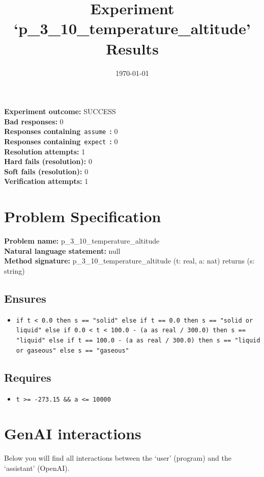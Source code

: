 \documentclass{article}
\begin{document}
\title{Experiment `p\_3\_10\_temperature\_altitude' Results}
\author{\today}
\date{}
\maketitle
\textbf{Experiment outcome: }SUCCESS
\\\textbf{Bad responses: }0
\\\textbf{Responses containing}~\texttt{assume}~\textbf{: }0
\\\textbf{Responses containing}~\texttt{expect}~\textbf{: }0
\\\textbf{Resolution attempts: }1
\\\textbf{Hard fails (resolution): }0
\\\textbf{Soft fails (resolution): }0
\\\textbf{Verification attempts: }1
\section*{Problem Specification}
\textbf{Problem name: }p\_3\_10\_temperature\_altitude
\\\textbf{Natural language statement: }null
\\\textbf{Method signature: }p\_3\_10\_temperature\_altitude (t: real, a: nat) returns (s: string)
\subsection*{Ensures}
\begin{itemize}
\item \texttt{if t < 0.0 then s == "solid" else if t == 0.0 then s == "solid or liquid" else if 0.0 < t < 100.0 - (a as real / 300.0) then s == "liquid" else if t == 100.0 - (a as real / 300.0) then s == "liquid or gaseous" else s == "gaseous"}
\end{itemize}
\subsection*{Requires}
\begin{itemize}
\item \texttt{t >= -273.15 \&\& a <= 10000}
\end{itemize}
\clearpage
\section*{GenAI interactions}
Below you will find all interactions between the `user' (program) and the `assistant' (OpenAI).
\end{document}
